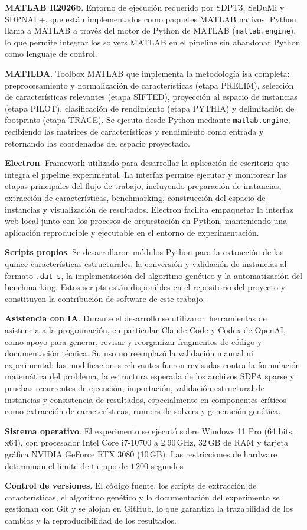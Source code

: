 \textbf{MATLAB R2026b}. Entorno de ejecución requerido por SDPT3, SeDuMi y SDPNAL+, que están implementados
como paquetes MATLAB nativos. Python llama a MATLAB a través del motor de Python de MATLAB
(\texttt{matlab.engine}), lo que permite integrar los solvers MATLAB en el pipeline sin abandonar Python como
lenguaje de control.

\textbf{MATILDA}. Toolbox MATLAB que implementa la metodología \acrshort{isa} completa: preprocesamiento y normalización
de características (etapa PRELIM), selección de características relevantes (etapa SIFTED), proyección al espacio de
instancias (etapa PILOT), clasificación de rendimiento (etapa PYTHIA) y delimitación de footprints (etapa TRACE).
Se ejecuta desde Python mediante \texttt{matlab.engine}, recibiendo las matrices de características y rendimiento
como entrada y retornando las coordenadas del espacio proyectado.

\textbf{Electron}. Framework utilizado para desarrollar la aplicación de escritorio que integra el pipeline experimental.
La interfaz permite ejecutar y monitorear las etapas principales del flujo de trabajo, incluyendo preparación de instancias,
extracción de características, benchmarking, construcción del espacio de instancias y visualización de resultados. Electron
facilita empaquetar la interfaz web local junto con los procesos de orquestación en Python, manteniendo una aplicación
reproducible y ejecutable en el entorno de experimentación.

\textbf{Scripts propios}. Se desarrollaron módulos Python para la extracción de las quince características
estructurales, la conversión y validación de instancias al formato \texttt{.dat-s}, la implementación del algoritmo
genético y la automatización del benchmarking. Estos scripts están disponibles en el repositorio del proyecto y
constituyen la contribución de software de este trabajo.

\textbf{Asistencia con IA}. Durante el desarrollo se utilizaron herramientas de asistencia a la programación,
en particular Claude Code y Codex de OpenAI, como apoyo para generar, revisar y reorganizar fragmentos de código
y documentación técnica. Su uso no reemplazó la validación manual ni experimental: las modificaciones relevantes
fueron revisadas contra la formulación matemática del problema, la estructura esperada de los archivos SDPA sparse
y pruebas recurrentes de ejecución, importación, validación estructural de instancias y consistencia de resultados,
especialmente en componentes críticos como extracción de características, runners de solvers y generación genética.

\textbf{Sistema operativo}. El experimento se ejecutó sobre Windows 11 Pro (64 bits, x64), 
con procesador Intel Core i7-10700 a 2.90\,GHz, 32\,GB de RAM y tarjeta gráfica NVIDIA
GeForce RTX 3080 (10\,GB). Las restricciones de hardware determinan el límite de tiempo de $1\,200$ segundos

\textbf{Control de versiones}. El código fuente, los scripts de extracción de características, el algoritmo genético
y la documentación del experimento se gestionan con Git y se alojan en GitHub, lo que garantiza la trazabilidad de
los cambios y la reproducibilidad de los resultados.
